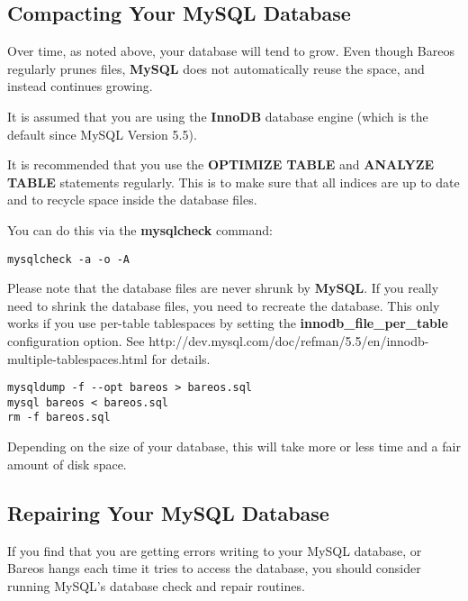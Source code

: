 \subsection{Compacting Your MySQL Database}
\label{CompactingMySQL}

Over time, as noted above, your database will tend to grow.
Even though Bareos regularly prunes files, {\bf MySQL} does not automatically
reuse the space, and instead continues growing.

It is assumed that you are using the {\bf InnoDB} database engine (which is the default since MySQL Version 5.5).

It is recommended that you use the {\bf OPTIMIZE TABLE} and {\bf ANALYZE TABLE}
statements regularly. This is to make sure that all indices are up to date
and to recycle space inside the database files.


You can do this via the {\bf mysqlcheck} command:
\footnotesize
\begin{verbatim}
mysqlcheck -a -o -A
\end{verbatim}
\normalsize

Please note that the database files are never shrunk by {\bf MySQL}. If you really need to shrink the database files, you need to recreate the database. This only works if you use per-table tablespaces by setting the {\bf innodb\_file\_per\_table} configuration option.
See
{http://dev.mysql.com/doc/refman/5.5/en/innodb-multiple-tablespaces.html} for details.

\footnotesize
\begin{verbatim}
mysqldump -f --opt bareos > bareos.sql
mysql bareos < bareos.sql
rm -f bareos.sql
\end{verbatim}
\normalsize

Depending on the size of your database, this will take more or less time and a
fair amount of disk space.

\subsection{Repairing Your MySQL Database}
\label{RepairingMySQL}

If you find that you are getting errors writing to your MySQL database, or
Bareos hangs each time it tries to access the database, you should consider
running MySQL's database check and repair routines.


